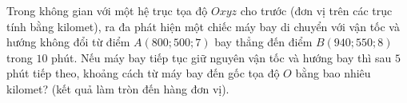 \begin{ex}%
Trong không gian với một hệ trục tọa độ $Oxyz$ cho trước (đơn vị trên các trục tính bằng kilomet), ra đa phát hiện một chiếc máy bay di chuyển với vận tốc và hướng không đổi từ điểm $A(800;500;7)$ bay thẳng đến điểm $B(940;550;8)$ trong $10$ phút. Nếu máy bay tiếp tục giữ nguyên vận tốc và hướng bay thì sau $5$ phút tiếp theo, khoảng cách từ máy bay đến gốc tọa độ $O$ bằng bao nhiêu kilomet? (kết quả làm tròn đến hàng đơn vị).
\end{ex}

